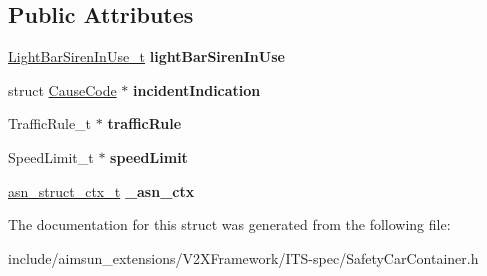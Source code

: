 \subsection*{Public Attributes}
\begin{DoxyCompactItemize}
\item 
\hyperlink{structBIT__STRING__s}{Light\+Bar\+Siren\+In\+Use\+\_\+t} {\bfseries light\+Bar\+Siren\+In\+Use}\hypertarget{structSafetyCarContainer_afc37fd17e0227415f66bc4d99f7d9d9c}{}\label{structSafetyCarContainer_afc37fd17e0227415f66bc4d99f7d9d9c}

\item 
struct \hyperlink{structCauseCode}{Cause\+Code} $\ast$ {\bfseries incident\+Indication}\hypertarget{structSafetyCarContainer_a00d45c7fbee1d2859a71394ca5f08945}{}\label{structSafetyCarContainer_a00d45c7fbee1d2859a71394ca5f08945}

\item 
Traffic\+Rule\+\_\+t $\ast$ {\bfseries traffic\+Rule}\hypertarget{structSafetyCarContainer_a1a691a352f6d136267ebacfdf60d9284}{}\label{structSafetyCarContainer_a1a691a352f6d136267ebacfdf60d9284}

\item 
Speed\+Limit\+\_\+t $\ast$ {\bfseries speed\+Limit}\hypertarget{structSafetyCarContainer_a4dd5984f07e8646f433f7e18f1d3bf11}{}\label{structSafetyCarContainer_a4dd5984f07e8646f433f7e18f1d3bf11}

\item 
\hyperlink{structasn__struct__ctx__s}{asn\+\_\+struct\+\_\+ctx\+\_\+t} {\bfseries \+\_\+asn\+\_\+ctx}\hypertarget{structSafetyCarContainer_a8212681836d5a4c99897fa1f9362d35c}{}\label{structSafetyCarContainer_a8212681836d5a4c99897fa1f9362d35c}

\end{DoxyCompactItemize}


The documentation for this struct was generated from the following file\+:\begin{DoxyCompactItemize}
\item 
include/aimsun\+\_\+extensions/\+V2\+X\+Framework/\+I\+T\+S-\/spec/Safety\+Car\+Container.\+h\end{DoxyCompactItemize}
